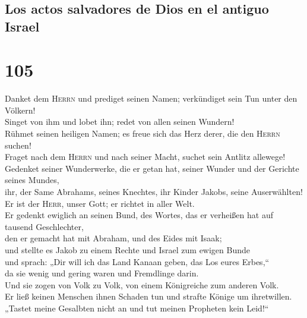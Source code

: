 \hypertarget{los-actos-salvadores-de-dios-en-el-antiguo-israel}{%
\subsection{Los actos salvadores de Dios en el antiguo
Israel}\label{los-actos-salvadores-de-dios-en-el-antiguo-israel}}

\hypertarget{section-104}{%
\section{105}\label{section-104}}

 Danket dem \textsc{Herrn} und prediget seinen Namen;
verkündiget sein Tun unter den Völkern!\\
 Singet von ihm und lobet ihn; redet von allen seinen
Wundern!\\
 Rühmet seinen heiligen Namen; es freue sich das Herz
derer, die den \textsc{Herrn} suchen!\\
 Fraget nach dem \textsc{Herrn} und nach seiner Macht,
suchet sein Antlitz allewege!\\
 Gedenket seiner Wunderwerke, die er getan hat, seiner
Wunder und der Gerichte seines Mundes,\\
 ihr, der Same Abrahams, seines Knechtes, ihr Kinder
Jakobs, seine Auserwählten!\\
 Er ist der \textsc{Herr}, unser Gott; er richtet in aller
Welt.\\
 Er gedenkt ewiglich an seinen Bund, des Wortes, das er
verheißen hat auf tausend Geschlechter,\\
 den er gemacht hat mit Abraham, und des Eides mit
Isaak;\\
 und stellte es Jakob zu einem Rechte und Israel zum
ewigen Bunde\\
 und sprach: „Dir will ich das Land Kanaan geben, das Los
eures Erbes,``\\
 da sie wenig und gering waren und Fremdlinge darin.\\
 Und sie zogen von Volk zu Volk, von einem Königreiche
zum anderen Volk.\\
 Er ließ keinen Menschen ihnen Schaden tun und strafte
Könige um ihretwillen.\\
 „Tastet meine Gesalbten nicht an und tut meinen
Propheten kein Leid!{}``\\
